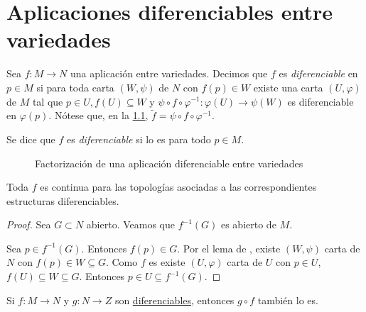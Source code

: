 \documentclass[../VD.tex]{subfiles}
\begin{document}
\setcounter{chapter}{1}
\chapter{Aplicaciones diferenciables entre variedades}
\label{chap:app}

\begin{definition}[diferenciable]
  \label{def:diferenciable}
  Sea \(f \colon M \to N\) una aplicación entre variedades. Decimos que \(f\) es
  \emph{diferenciable} en \(p \in M\) si para toda carta \((W,\psi)\) de \(N\)
  con \(f(p) \in W\) existe una carta \((U,\varphi)\) de \(M\) tal que \(p \in
  U, f(U) \subseteq W\) y \(\psi \circ f \circ \varphi^{-1} \colon \varphi(U)
  \to \psi(W)\) es diferenciable en \(\varphi(p)\). Nótese que, en la
  \cref{fig:factorizacion-diferenciable}, \(\widetilde{f} = \psi \circ f \circ
  \varphi^{-1}\).

  Se dice que \(f\) es \emph{diferenciable} si lo es para todo \(p \in M\).
\end{definition}

\begin{figure}[h]
  \centering
  \caption{Factorización de una aplicación diferenciable entre variedades}
  \label{fig:factorizacion-diferenciable}
\end{figure}

\begin{lemma}
  Toda \(f\)  es continua para las topologías
  asociadas a las correspondientes estructuras diferenciables.
\end{lemma}

\begin{proof}
  Sea \(G \subset N\) abierto. Veamos que \(f^{-1}(G)\) es abierto de \(M\).

  Sea \(p \in f^{-1}(G)\). Entonces \(f(p) \in G\). Por el
  lema de , existe
  \((W,\psi)\) carta de \(N\) con \(f(p) \in W \subseteq G\). Como \(f\) es
   existe \((U,\varphi)\) carta de \(U\) con \(p \in
  U\), \(f(U) \subseteq W \subseteq G\). Entonces \(p \in U \subseteq
  f^{-1}(G)\). 
\end{proof}

\begin{lemma}
  Si \(f \colon M \to N\) y \(g \colon N \to Z\) son
  \hyperref[def:diferenciable]{diferenciables}, entonces \(g \circ f\) también
  lo es.
\end{lemma}
\end{document}
